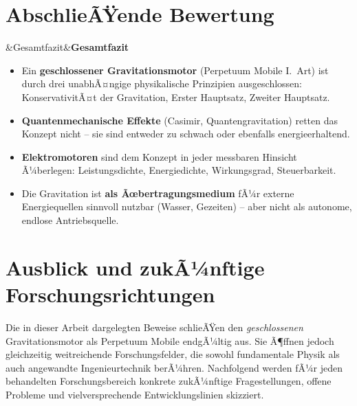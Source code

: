 ﻿\documentclass[12pt, a4paper]{report}
\newenvironment{wichtig}[1][]{%
  \begin{wichtigframe}\sloppy%
  \ifx&#1&\else\textbf{#1}\par\smallskip\fi}{\end{wichtigframe}}
\theoremstyle{definition}
\theoremstyle{remark}
\begin{document}
\section{AbschlieÃŸende Bewertung}

\begin{wichtig}[Gesamtfazit]
  \begin{itemize}
    \item Ein \textbf{geschlossener Gravitationsmotor} (Perpetuum Mobile I.\ Art)
          ist durch drei unabhÃ¤ngige physikalische Prinzipien ausgeschlossen:
          KonservativitÃ¤t der Gravitation, Erster Hauptsatz, Zweiter Hauptsatz.
    \item \textbf{Quantenmechanische Effekte} (Casimir, Quantengravitation)
          retten das Konzept nicht -- sie sind entweder zu schwach oder ebenfalls energieerhaltend.
    \item \textbf{Elektromotoren} sind dem Konzept in jeder messbaren Hinsicht
          Ã¼berlegen: Leistungsdichte, Energiedichte, Wirkungsgrad, Steuerbarkeit.
    \item Die Gravitation ist \textbf{als Ãœbertragungsmedium} fÃ¼r externe
          Energiequellen sinnvoll nutzbar (Wasser, Gezeiten) -- aber nicht als
          autonome, endlose Antriebsquelle.
  \end{itemize}
\end{wichtig}

\section{Ausblick und zukÃ¼nftige Forschungsrichtungen}
\label{sec:ausblick}

Die in dieser Arbeit dargelegten Beweise schlieÃŸen den \emph{geschlossenen}
Gravitationsmotor als Perpetuum Mobile endgÃ¼ltig aus. Sie Ã¶ffnen jedoch
gleichzeitig weitreichende Forschungsfelder, die sowohl fundamentale Physik als
auch angewandte Ingenieurtechnik berÃ¼hren. Nachfolgend werden fÃ¼r jeden
behandelten Forschungsbereich konkrete zukÃ¼nftige Fragestellungen, offene
Probleme und vielversprechende Entwicklungslinien skizziert.
\end{document}
